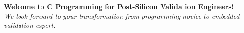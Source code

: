 \documentclass[11pt,a4paper]{article}
\begin{document}
\vspace{1cm}

\begin{center}
\textbf{Welcome to C Programming for Post-Silicon Validation Engineers!}\\
\textit{We look forward to your transformation from programming novice to embedded validation expert.}
\end{center}
\end{document}
